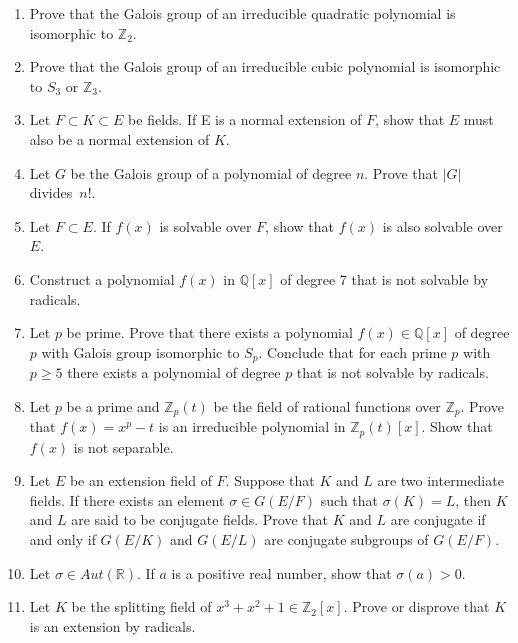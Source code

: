 {\begin{enumerate}
 
 
 
\item
Prove that the Galois group of an irreducible quadratic polynomial is
isomorphic to ${\mathbb Z}_2$.
 
 
\item
Prove that the Galois group of an irreducible cubic polynomial is
isomorphic to $S_3$ or ${\mathbb Z}_3$.
 
 
\item
Let $F \subset K \subset E$ be fields. If E is a normal extension of
$F$, show that $E$ must also be a normal extension of $K$.
 
 
\item
Let $G$ be the Galois group of a polynomial of degree $n$.  Prove
that $|G|$ divides~$n!$.
 
 
\item
Let $F \subset E$.  If $f(x)$ is solvable over $F$, show that $f(x)$
is also solvable over $E$.
 
 
\item
Construct a polynomial $f(x)$ in ${\mathbb Q}[x]$ of degree 7 that is not
solvable by \linebreak radicals.
 
 
\item
Let $p$ be prime.  Prove that there exists a polynomial $f(x) \in
{\mathbb Q}[x]$ of degree $p$ with Galois group isomorphic to $S_p$.
Conclude that for each prime $p$ with $p \geq 5$ there exists a
polynomial of degree $p$ that is not solvable by radicals. 
 
 
\item
Let $p$ be a prime and ${\mathbb Z}_p(t)$ be the field of rational
functions over ${\mathbb Z}_p$.  Prove that $f(x) = x^p - t$ is an
irreducible polynomial in ${\mathbb Z}_p(t)[x]$.  Show that $f(x)$ is not
separable. 
 
 
\item
Let $E$ be an extension field of $F$. Suppose that $K$ and $L$ are two 
intermediate fields.  If there exists an element $\sigma \in G(E/F)$
such that $\sigma(K) = L$, then $K$ and $L$ are said to be {\bfi
conjugate fields}.
Prove that $K$ and $L$ are conjugate if and only if $G(E/K)$ and
$G(E/L)$ are conjugate subgroups of $G(E/F)$. 
 
 
\item 
Let $\sigma \in Aut( {\mathbb R} )$.  If $a$ is a positive real
number, show that $\sigma( a) > 0$.
 
 
\item 
Let $K$ be the splitting field of $x^3 + x^2 + 1 \in {\mathbb Z}_2[x]$.
Prove or disprove that $K$ is an extension by radicals.
 

\end{enumerate}}
